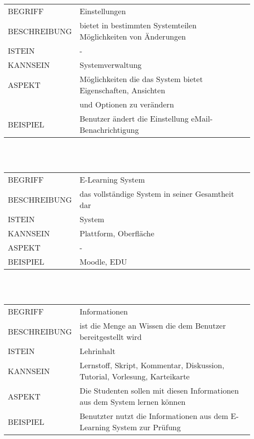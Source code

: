 \documentclass[12pt,a4paper]{article}
\begin{document}
\begin{tabular}{l p{10cm}}
BEGRIFF 	 & Einstellungen \\ 
BESCHREIBUNG & bietet in bestimmten Systemteilen Möglichkeiten von Änderungen\\
ISTEIN   	 & -\\
KANNSEIN 	 & Systemverwaltung\\ 
ASPEKT   	 & Möglichkeiten die das System bietet Eigenschaften, Ansichten\\
			 & und Optionen zu verändern\\ 
BEISPIEL 	 & Benutzer ändert die Einstellung eMail-Benachrichtigung\\
\hline
\end{tabular}\\\\  

\begin{tabular}{l p{10cm}}
BEGRIFF 	 & E-Learning System \\ 
BESCHREIBUNG & das vollständige System in seiner Gesamtheit dar\\ 
ISTEIN   	 & System\\
KANNSEIN 	 & Plattform, Oberfläche\\ 
ASPEKT   	 & -\\
BEISPIEL 	 & Moodle, EDU\\
\hline
\end{tabular}\\\\  

\begin{tabular}{l p{10cm}}
BEGRIFF 	 & Informationen \\ 
BESCHREIBUNG & ist die Menge an Wissen die dem Benutzer bereitgestellt wird\\ 
ISTEIN   	 & Lehrinhalt\\
KANNSEIN 	 & Lernstoff, Skript, Kommentar, Diskussion, Tutorial, Vorlesung, Karteikarte\\ 
ASPEKT   	 & Die Studenten sollen mit diesen Informationen aus dem System lernen können\\
BEISPIEL 	 & Benutzter nutzt die Informationen aus dem E-Learning System zur Prüfung\\
\hline
\end{tabular}\\\\  
\end{document}
